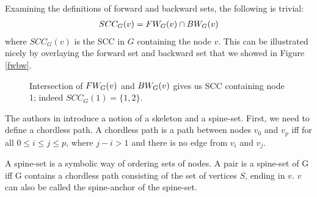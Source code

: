 \documentclass[../master/master.tex]{subfiles}
\begin{document}
\noindent Examining the definitions of forward and backward sets, the following is trivial:
\begin{align}
SCC_G(v) = FW_{G}(v) \cap BW_{G}(v) \label{scc}
\end{align} 
where $SCC_G(v)$ is the SCC in $G$ containing the node $v$. This can be illustrated nicely by overlaying the forward set and backward set that we showed in Figure \ref{fwbw}.


\begin{figure}[H]
\center
{}
\caption{Intersection of $FW_{G}(v)$ and $BW_{G}(v)$ gives us SCC containing node 1; indeed $SCC_G(1) = \{1,2\}$. } 
\end{figure}

The authors in \cite{linear} introduce a notion of a skeleton and a spine-set. First, we need to define a chordless path. A chordless path is a path between nodes $v_0$ and $v_p$ iff for all $0\leq i \leq j \leq p$, where $j-i>1$ and there is no edge from $v_i$ and $v_j$.

A spine-set is a symbolic way of ordering sets of nodes. A pair  is a spine-set of G iff G contains a chordless path consisting of the set of vertices $S$, ending in $v$. $v$ can also be called the spine-anchor of the spine-set.
\end{document}
